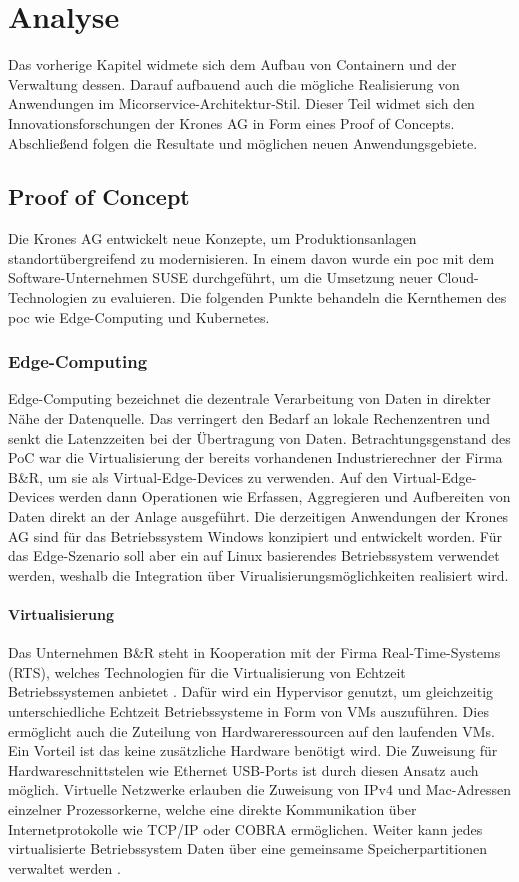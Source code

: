 \chapter{Analyse}

Das vorherige Kapitel widmete sich dem Aufbau von Containern und der Verwaltung dessen.
Darauf aufbauend auch die mögliche Realisierung von Anwendungen im Micorservice-Architektur-Stil. 
Dieser Teil widmet sich den Innovationsforschungen der Krones AG in Form eines Proof of Concepts.
Abschließend folgen die Resultate und möglichen neuen Anwendungsgebiete.


\section{Proof of Concept}\label{moderninfra}
Die Krones AG entwickelt neue Konzepte, um Produktionsanlagen standortübergreifend zu modernisieren. 
In einem davon wurde ein \ac{poc} mit dem Software-Unternehmen SUSE durchgeführt, um die Umsetzung neuer Cloud-Technologien zu evaluieren. 
Die folgenden Punkte behandeln die Kernthemen des \acs{poc} wie Edge-Computing und Kubernetes.

\subsection{Edge-Computing}
Edge-Computing bezeichnet die dezentrale Verarbeitung von Daten in direkter Nähe der Datenquelle. 
Das verringert den Bedarf an lokale Rechenzentren und senkt die Latenzzeiten bei der Übertragung von Daten. 
Betrachtungsgenstand des PoC war die Virtualisierung der bereits vorhandenen Industrierechner der Firma B\&R, um sie als Virtual-Edge-Devices zu verwenden.
Auf den Virtual-Edge-Devices werden dann Operationen wie Erfassen, Aggregieren und Aufbereiten von Daten direkt an der Anlage ausgeführt. 
Die derzeitigen Anwendungen der Krones AG sind für das Betriebssystem Windows konzipiert und entwickelt worden.
Für das Edge-Szenario soll aber ein auf Linux basierendes Betriebssystem verwendet werden,
weshalb die Integration über Virualisierungsmöglichkeiten realisiert wird.

\subsubsection{Virtualisierung}
Das Unternehmen B\&R steht in Kooperation mit der Firma Real-Time-Systems (RTS), welches Technologien für die Virtualisierung von Echtzeit Betriebssystemen anbietet \cite{rtosandbundr}.
Dafür wird ein Hypervisor genutzt, um gleichzeitig unterschiedliche Echtzeit Betriebssysteme in Form von VMs auszuführen.
Dies ermöglicht auch die Zuteilung von Hardwareressourcen auf den laufenden VMs.
Ein Vorteil ist das keine zusätzliche Hardware benötigt wird.
Die Zuweisung für Hardwareschnittstelen wie Ethernet USB-Ports ist durch diesen Ansatz auch möglich.
Virtuelle Netzwerke erlauben die Zuweisung von IPv4 und Mac-Adressen einzelner Prozessorkerne, welche
eine direkte Kommunikation über Internetprotokolle wie TCP/IP oder COBRA ermöglichen.
Weiter kann jedes virtualisierte Betriebssystem Daten über eine gemeinsame Speicherpartitionen verwaltet werden \cite{rtos}.

